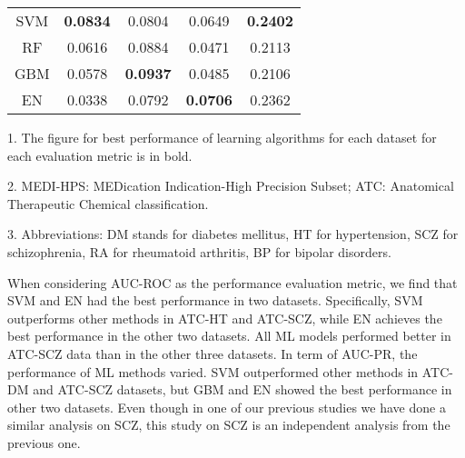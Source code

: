 \begin{table}[htbp]
\begin{threeparttable}
\begin{tabular}{ccccc}
        SVM   & \textbf{0.0834} &     0.0804      &     0.0649      & \textbf{0.2402} \\
        RF    &     0.0616      &     0.0884      &     0.0471      &     0.2113 \\
        GBM   &     0.0578      & \textbf{0.0937} &     0.0485      &     0.2106 \\
        EN    &     0.0338      &     0.0792      & \textbf{0.0706} &     0.2362 \\
        \bottomrule
        \end{tabular}%
        \begin{tablenotes}
          \item 1. The figure for best performance of learning algorithms for each dataset for each evaluation metric is in bold.
          \item 2. MEDI-HPS: MEDication Indication-High Precision Subset; ATC: Anatomical Therapeutic Chemical classification.
          \item 3. Abbreviations: DM stands for diabetes mellitus, HT for hypertension, SCZ for schizophrenia, RA for rheumatoid arthritis, BP for bipolar disorders.          
        \end{tablenotes}
      \end{threeparttable}
      \label{tab:target_ml_performance}%
    \end{table}

    When considering AUC-ROC as the performance evaluation metric, we find that SVM and EN had the best performance in two datasets. Specifically, SVM outperforms other methods in ATC-HT and ATC-SCZ, while EN achieves the best performance in the other two datasets. All ML models performed better in ATC-SCZ data than in the other three datasets. In term of AUC-PR, the performance of  ML methods varied. SVM outperformed other methods in ATC-DM and ATC-SCZ datasets, but GBM and EN showed the best performance in other two datasets. Even though in one of our previous studies \cite{zhao2018drug} we have done a similar analysis on SCZ, this study on SCZ is an independent analysis from the previous one. 

